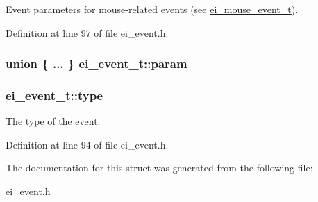 Event parameters for mouse-\/related events (see \hyperlink{structei__mouse__event__t}{ei\-\_\-mouse\-\_\-event\-\_\-t}). 



Definition at line 97 of file ei\-\_\-event.\-h.

\hypertarget{structei__event__t_a03a01773dff790d4b772f6b16e4fbb4b}{
\subsubsection[{param}]{\setlength{\rightskip}{0pt plus 5cm}union \{ ... \}   ei\-\_\-event\-\_\-t\-::param}}\label{structei__event__t_a03a01773dff790d4b772f6b16e4fbb4b}
\hypertarget{structei__event__t_aee18f11986ed603959de628558812c58}{
\subsubsection[{type}]{ ei\-\_\-event\-\_\-t\-::type}}\label{structei__event__t_aee18f11986ed603959de628558812c58}


The type of the event. 



Definition at line 94 of file ei\-\_\-event.\-h.



The documentation for this struct was generated from the following file\-:\begin{DoxyCompactItemize}
\item 
\hyperlink{ei__event_8h}{ei\-\_\-event.\-h}\end{DoxyCompactItemize}
